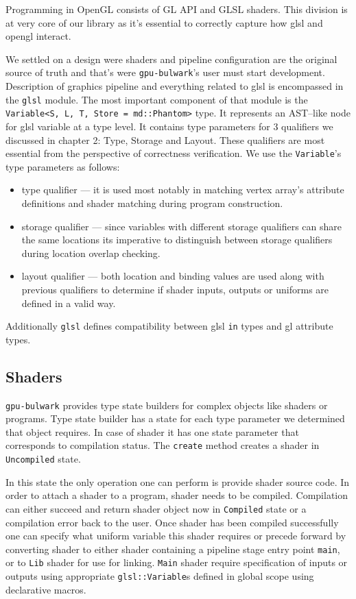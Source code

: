 Programming in OpenGL consists of GL API and GLSL shaders. This division is at very core of our library as it's essential to correctly capture how glsl and opengl interact.

We settled on a design were shaders and pipeline configuration are the original source of truth and that's were \texttt{gpu-bulwark}'s user must start development.
Description of graphics pipeline and everything related to glsl is encompassed in the \texttt{glsl} module.
The most important component of that module is the \texttt{Variable<S, L, T, Store = md::Phantom>} type.
It represents an AST--like node for glsl variable at a type level.
It contains type parameters for 3 qualifiers we discussed in chapter 2: Type, Storage and Layout. These qualifiers are most essential from the perspective of correctness verification.
We use the \texttt{Variable}'s type parameters as follows:
\begin{itemize}
    \item type qualifier --- it is used most notably in matching vertex array's attribute definitions and shader matching during program construction.
    \item storage qualifier --- since variables with different storage qualifiers can share the same locations its imperative to distinguish between storage qualifiers during location overlap checking.
    \item layout qualifier --- both location and binding values are used along with previous qualifiers to determine if shader inputs, outputs or uniforms are defined in a valid way.
\end{itemize}

Additionally \texttt{glsl} defines compatibility between glsl \texttt{in} types and gl attribute types.

\subsection{Shaders}

\texttt{gpu-bulwark} provides type state builders for complex objects like shaders or programs. Type state builder has a state for each type parameter we determined that object requires.
In case of shader it has one state parameter that corresponds to compilation status. The \texttt{create} method creates a shader in \texttt{Uncompiled} state.

In this state the only operation one can perform is provide shader source code. In order to attach a shader to a program, shader needs to be compiled. 
Compilation can either succeed and return shader object now in \texttt{Compiled} state or a compilation error back to the user.
Once shader has been compiled successfully one can specify what uniform variable this shader requires or precede forward by converting shader 
to either shader containing a pipeline stage entry point \texttt{main}, or to \texttt{Lib} shader for use for linking.
\texttt{Main} shader require specification of inputs or outputs using appropriate \texttt{glsl::Variable}s defined in global scope using declarative macros.

